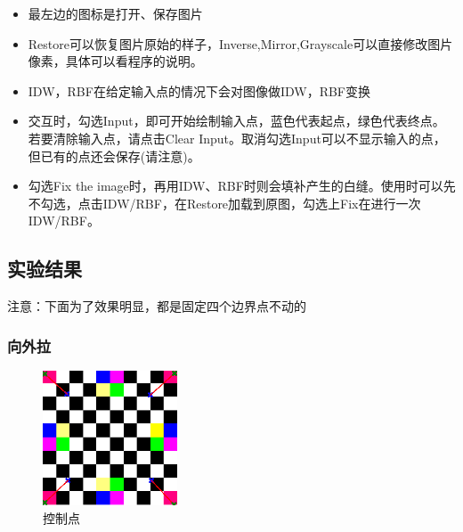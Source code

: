 \documentclass{article}
\begin{document}
    	\begin{itemize}
    	\item 最左边的图标是打开、保存图片
    \end{itemize}
    \begin{itemize}
    	\item Restore可以恢复图片原始的样子，Inverse,Mirror,Grayscale可以直接修改图片像素，具体可以看程序的说明。
    \end{itemize}
    \begin{itemize}
    	\item IDW，RBF在给定输入点的情况下会对图像做IDW，RBF变换
    \end{itemize}
    \begin{itemize}
    	\item 交互时，勾选Input，即可开始绘制输入点，蓝色代表起点，绿色代表终点。若要清除输入点，请点击Clear Input。取消勾选Input可以不显示输入的点，但已有的点还会保存(请注意)。
    \end{itemize}
    \begin{itemize}
    	\item 勾选Fix the image时，再用IDW、RBF时则会填补产生的白缝。使用时可以先不勾选，点击IDW/RBF，在Restore加载到原图，勾选上Fix在进行一次IDW/RBF。
    \end{itemize}
  
  
   \subsection{实验结果}
   
   注意：下面为了效果明显，都是固定四个边界点不动的
   
		\subsubsection{向外拉}
		
			\begin{figure}[H]
			\begin{center}
				
				\includegraphics[width=4cm,height=4cm]{input1}
				
				\caption{控制点} \label{input2.label}
			\end{center}
		\end{figure}
	
\end{document}
